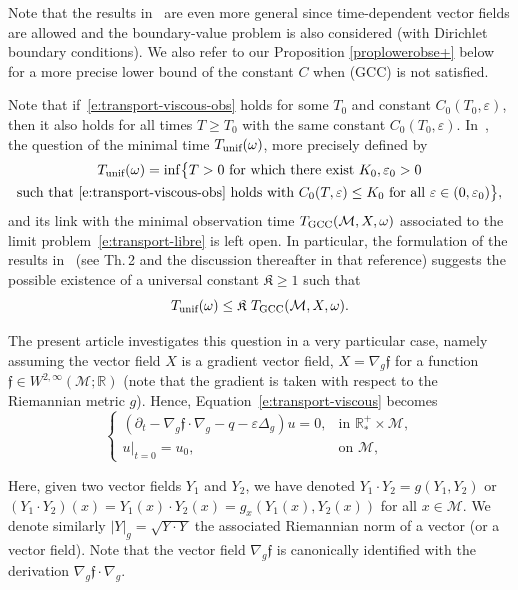 \documentclass[JEP,XML,SOM,Unicode]{cedram}
\newcommand{\GCC}{\textup{GCC}}
\newcommand{\pGCC}{\textup{(GCC)}\xspace}
\newcommand{\unif}{\textup{unif}}
\theoremstyle{definition}
\newcommand{\M}{\ensuremath{\mathcal M}}
\newcommand{\mb}[1]{\ensuremath{\mathbb{#1}}}
\newcommand{\R}{{\mb{R}}}
\newcommand{\f}{\ensuremath{\mathfrak{f}}}
\let\d\partial
\let\eps\varepsilon
\let\q q
\begin{document}
Note that the results in~\cite{GL:07} are even more general since time-dependent vector fields are allowed and the boundary-value problem is also considered (with Dirichlet boundary conditions). We also refer to our Proposition \ref{proplowerobse+} below for a more precise lower bound of the constant $C$ when \pGCC is not satisfied.

Note that if~\eqref{e:transport-viscous-obs} holds for some $T_0$ and constant $C_0(T_0,\eps)$, then it also holds for all times $T\geq T_0$ with the same constant $C_0(T_0,\eps)$.
In~\cite{GL:07}, the question of the minimal time $T_{\unif}(\omega)$, more precisely defined by
\begin{multline*}
T_{\unif}(\omega) = \inf \bigl\{ T >0 \text{ for which there exist }K_0, \eps_0>0 \\
\text {such that~\eqref{e:transport-viscous-obs} holds with }C_0(T,\eps)\leq K_0 \text{ for all } \eps \in (0,\eps_0) \bigr\},
\end{multline*}
and its link with the minimal observation time $T_{\GCC}(\M,X,\omega)$ associated to the limit problem~\eqref{e:transport-libre} is left open.
In particular, the formulation of the results in~\cite{GL:07} (see \eg Th.\,2 and the discussion thereafter in that reference) suggests the possible existence of a universal constant $\mathfrak{K}\geq 1$ such that
\begin{equation}
\label{e:universal-K}
T_{\unif}(\omega) \leq \mathfrak{K}\ T_{\GCC}(\M,X,\omega).
\end{equation}

The present article investigates this question in a very particular case, namely assuming the vector field $X$ is a gradient vector field, \ie $X= \nabla_g \f$ for a function $\f\in W^{2,\infty}(\M;\R)$ (note that the gradient is taken with respect to the Riemannian metric $g$). Hence, Equation~\eqref{e:transport-viscous} becomes
\begin{equation}
\label{e:transport-viscous-gradient}
\begin{cases}
(\d_t - \nabla_g \f \cdot \nabla_g -\q - \eps \Delta_g ) u = 0, & \text{in } \R^+_*\times \M, \\
u|_{t=0} = u_0, & \text{on } \M,
\end{cases}
\end{equation}

Here, given two vector fields $Y_1$ and $Y_2$, we have denoted $Y_1\cdot Y_2 = g(Y_1,Y_2)$ or $(Y_1\cdot Y_2)(x) = Y_1(x)\cdot Y_2(x) = g_x(Y_1(x),Y_2(x))$ for all $x\in \M$. We denote similarly $|Y|_g = \sqrt{Y \cdot Y}$ the associated Riemannian norm of a vector (or a vector field).
Note that the vector field $\nabla_g \f$ is canonically identified with the derivation $\nabla_g \f \cdot \nabla_g$.
\end{document}
